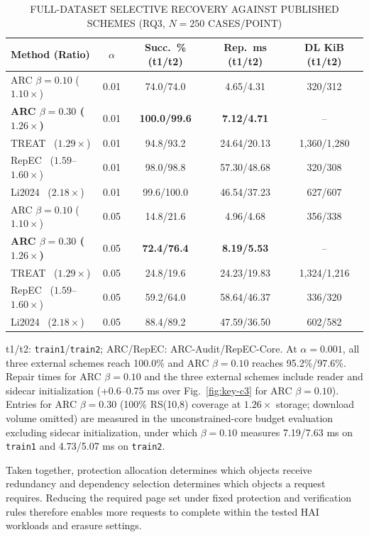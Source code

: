 \documentclass[10pt,journal]{IEEEtran}
\newcommand{\tabnote}[1]{\par\smallskip\parbox{\linewidth}{\footnotesize #1}}
\begin{document}
\begin{table}[t]\centering\scriptsize
\caption{FULL-DATASET SELECTIVE RECOVERY AGAINST PUBLISHED SCHEMES (RQ3, $N{=}250$ CASES/POINT)}\label{tab:rq3-ext}
\setlength{\tabcolsep}{2.0pt}
\begin{tabular}{@{}lcccc@{}}\toprule
Method (Ratio) & $\alpha$ & Succ.\ \% (t1/t2) & Rep.\ ms (t1/t2) & DL KiB (t1/t2)\\\midrule
ARC $\beta{=}0.10$ ($1.10\times$) & 0.01 & 74.0/74.0 & 4.65/4.31 & 320/312\\
\textbf{ARC $\beta{=}0.30$ ($1.26\times$)} & 0.01 & \textbf{100.0/99.6} & \textbf{7.12/4.71} & --\\
TREAT~\cite{Taurone2024TREAT} ($1.29\times$) & 0.01 & 94.8/93.2 & 24.64/20.13 & 1,360/1,280\\
RepEC~\cite{Zuo2022RepECPlus} ($1.59$--$1.60\times$) & 0.01 & 98.0/98.8 & 57.30/48.68 & 320/308\\
Li2024~\cite{Li2024TNSE} ($2.18\times$) & 0.01 & 99.6/100.0 & 46.54/37.23 & 627/607\\\midrule
ARC $\beta{=}0.10$ ($1.10\times$) & 0.05 & 14.8/21.6 & 4.96/4.68 & 356/338\\
\textbf{ARC $\beta{=}0.30$ ($1.26\times$)} & 0.05 & \textbf{72.4/76.4} & \textbf{8.19/5.53} & --\\
TREAT~\cite{Taurone2024TREAT} ($1.29\times$) & 0.05 & 24.8/19.6 & 24.23/19.83 & 1,324/1,216\\
RepEC~\cite{Zuo2022RepECPlus} ($1.59$--$1.60\times$) & 0.05 & 59.2/64.0 & 58.64/46.37 & 336/320\\
Li2024~\cite{Li2024TNSE} ($2.18\times$) & 0.05 & 88.4/89.2 & 47.59/36.50 & 602/582\\\bottomrule
\end{tabular}
\tabnote{t1/t2: \texttt{train1}/\texttt{train2}; ARC/RepEC: ARC-Audit/RepEC-Core. At $\alpha{=}0.001$, all three external schemes reach 100.0\% and ARC $\beta{=}0.10$ reaches 95.2\%/97.6\%. Repair times for ARC $\beta{=}0.10$ and the three external schemes include reader and sidecar initialization (+0.6--0.75 ms over Fig.~\ref{fig:key-c3} for ARC $\beta{=}0.10$). Entries for ARC $\beta{=}0.30$ (100\% RS(10,8) coverage at $1.26\times$ storage; download volume omitted) are measured in the unconstrained-core budget evaluation excluding sidecar initialization, under which $\beta{=}0.10$ measures 7.19/7.63 ms on \texttt{train1} and 4.73/5.07 ms on \texttt{train2}.}
\end{table}

Taken together, protection allocation determines which objects receive redundancy and dependency selection determines which objects a request requires. Reducing the required page set under fixed protection and verification rules therefore enables more requests to complete within the tested HAI workloads and erasure settings.
\end{document}
